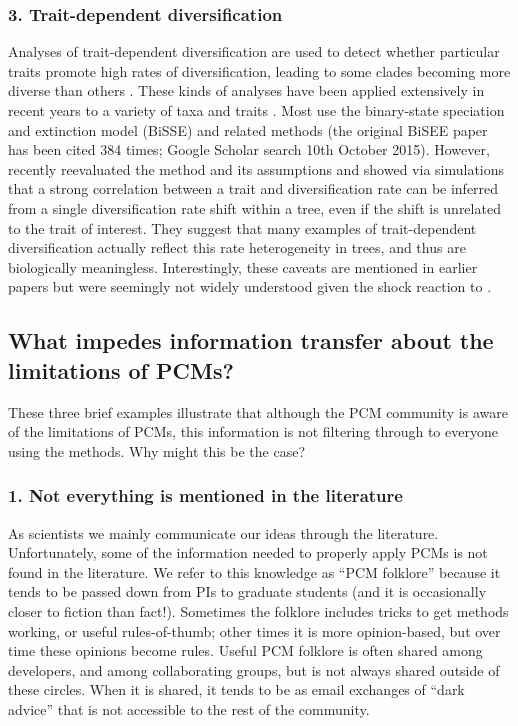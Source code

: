 \documentclass[a4paper,12pt]{article}
\begin{document}
\subsubsection{3. Trait-dependent diversification} %
Analyses of trait-dependent diversification are used to detect whether particular traits promote high rates of diversification, leading to some clades becoming more diverse than others \citep{nee1994reconstructed}. 
These kinds of analyses have been applied extensively in recent years to a variety of taxa and traits \citep[e.g.][]{}. %
Most use the binary-state speciation and extinction model (BiSSE) and related methods (the original BiSEE paper \citet{maddison2007estimating} has been cited 384 times; Google Scholar search 10th October 2015).
However, \citet{rabosky2015model} recently reevaluated the method and its assumptions and showed via simulations that a strong correlation between a trait and diversification rate can be inferred from a single diversification rate shift within a tree, even if the shift is unrelated to the trait of interest.
They suggest that many examples of trait-dependent diversification actually reflect this rate heterogeneity in trees, and thus are biologically meaningless.
Interestingly, these caveats are mentioned in earlier papers \citep{maddison2007estimating,fitzjohn2010quantitative,FitzJohn:2012aa} but were seemingly not widely understood given the shock reaction to \citet{rabosky2015model}.

\subsection{What impedes information transfer about the limitations of PCMs?}
These three brief examples illustrate that although the PCM community is aware of the limitations of PCMs, this information is not filtering through to everyone using the methods. 
Why might this be the case?

  \subsubsection{1. Not everything is mentioned in the literature}
    As scientists we mainly communicate our ideas through the literature. 
    Unfortunately, some of the information needed to properly apply PCMs is not found in the literature. 
    We refer to this knowledge as ``PCM folklore'' because it tends to be passed down from PIs to graduate students (and it is occasionally closer to fiction than fact!).
    Sometimes the folklore includes tricks to get methods working, or useful rules-of-thumb; other times it is more opinion-based, but over time these opinions become rules. 
    Useful PCM folklore is often shared among developers, and among collaborating groups, but is not always shared outside of these circles. 
    When it is shared, it tends to be as email exchanges of ``dark advice'' that is not accessible to the rest of the community.
\end{document}
